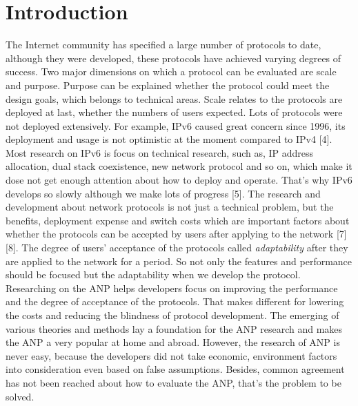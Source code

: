 \documentclass{article}
\begin{document}
\section{Introduction}
The Internet community has specified a large number of protocols to date, although they were developed, these
protocols have achieved varying degrees of success. Two major dimensions on which a protocol can be evaluated
are scale and purpose. Purpose can be explained whether the protocol could meet the design goals, which belongs
to technical areas. Scale relates to the protocols are deployed at last, whether the numbers of users expected.
Lots of protocols were not deployed extensively. For example, IPv6 caused great concern since 1996, its deployment
and usage is not optimistic at the moment compared to IPv4 [4]. Most research on IPv6 is focus on technical
research, such as, IP address allocation, dual stack coexistence, new network protocol and so on, which make
it dose not get enough attention about how to deploy and operate. That's why IPv6 develops so slowly although
we make lots of progress [5]. The research and development about network protocols is not just a technical
problem, but the benefits, deployment expense and switch costs which are important factors about whether the
protocols can be accepted by users after applying to the network [7][8]. The degree of users' acceptance
of the protocols called \emph{adaptability} after they are applied to the network for a period. So not only
the features and performance should be focused but the adaptability when we develop the protocol. Researching
on the ANP helps developers focus on improving the performance and the degree of acceptance of the protocols.
That makes different for lowering the costs and reducing the blindness of protocol development. The emerging
of various theories and methods lay a foundation for the ANP research and makes the ANP a very popular at
home and abroad. However, the research of ANP is never easy, because the developers did not take economic,
environment factors into consideration even based on false assumptions. Besides, common agreement has not
been reached about how to evaluate the ANP, that's the problem to be solved.
\end{document}
